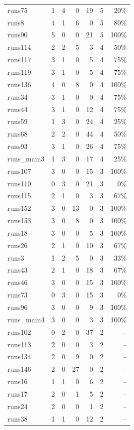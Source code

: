 \begin{longtable}{@{}lrrrrrr@{}}
runs75 & 1 & 4 & 0 & 19 & 5 & 20\% \\
runs8 & 4 & 1 & 6 & 0 & 5 & 80\% \\
runs90 & 5 & 0 & 0 & 21 & 5 & 100\% \\
runs114 & 2 & 2 & 5 & 3 & 4 & 50\% \\
runs117 & 3 & 1 & 0 & 5 & 4 & 75\% \\
runs119 & 3 & 1 & 0 & 5 & 4 & 75\% \\
runs136 & 4 & 0 & 8 & 0 & 4 & 100\% \\
runs34 & 3 & 1 & 0 & 0 & 4 & 75\% \\
runs44 & 3 & 1 & 0 & 12 & 4 & 75\% \\
runs59 & 1 & 3 & 0 & 24 & 4 & 25\% \\
runs68 & 2 & 2 & 0 & 44 & 4 & 50\% \\
runs93 & 3 & 1 & 0 & 26 & 4 & 75\% \\
runs\_main3 & 1 & 3 & 0 & 17 & 4 & 25\% \\
runs107 & 3 & 0 & 0 & 15 & 3 & 100\% \\
runs110 & 0 & 3 & 0 & 21 & 3 & 0\% \\
runs115 & 2 & 1 & 0 & 3 & 3 & 67\% \\
runs152 & 3 & 0 & 13 & 0 & 3 & 100\% \\
runs153 & 3 & 0 & 8 & 0 & 3 & 100\% \\
runs18 & 3 & 0 & 0 & 5 & 3 & 100\% \\
runs26 & 2 & 1 & 0 & 10 & 3 & 67\% \\
runs3 & 1 & 2 & 5 & 0 & 3 & 33\% \\
runs43 & 2 & 1 & 0 & 18 & 3 & 67\% \\
runs46 & 3 & 0 & 0 & 15 & 3 & 100\% \\
runs73 & 0 & 3 & 0 & 15 & 3 & 0\% \\
runs96 & 3 & 0 & 0 & 9 & 3 & 100\% \\
runs\_main4 & 3 & 0 & 0 & 3 & 3 & 100\% \\
runs102 & 0 & 2 & 0 & 37 & 2 & -- \\
runs113 & 2 & 0 & 0 & 3 & 2 & -- \\
runs134 & 2 & 0 & 9 & 0 & 2 & -- \\
runs146 & 2 & 0 & 27 & 0 & 2 & -- \\
runs16 & 1 & 1 & 0 & 6 & 2 & -- \\
runs17 & 2 & 0 & 1 & 5 & 2 & -- \\
runs24 & 2 & 0 & 0 & 1 & 2 & -- \\
runs38 & 1 & 1 & 0 & 12 & 2 & -- \\

\end{longtable}

